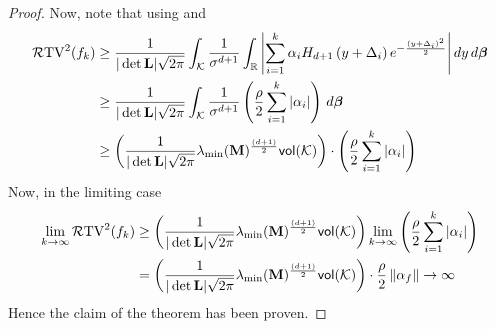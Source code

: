 \begin{proof}
    \noindent Now, note that using  and 
    \begin{align*}
        \mathcal{R}\mathrm{TV}^2({f_k}) &\ge \frac{1}{|\det \mathbf{L}| \sqrt{2\pi}} \int_{{\mathcal{K}}} \frac{1}{\sigma^{d+1}} \int_{\mathbb{R}} \left| \sum_{i=1}^k \alpha_i H_{d+1}\left( y + \Delta_i \right) e^{ -\frac{(y + \Delta_i)^2}{2} } \right| dy \, d\bm{\beta} \\
        & \ge \frac{1}{|\det \mathbf{L}| \sqrt{2\pi}} \int_{{\mathcal{K}}} \frac{1}{\sigma^{d+1}}   \left( {\frac{\rho}{2}\sum_{i=1}^k |\alpha_i| } \right)  \, d\bm{\beta}\\
        & \ge  \left( {\frac{1}{|\det \mathbf{L}| \sqrt{2\pi}} \lambda_{\min}(\mathbf{M})^{\frac{(d+1)} {2}} \textsf{vol}({{\mathcal{K}}})} \right)  \cdot \left( {\frac{\rho}{2}\sum_{i=1}^k |\alpha_i| } \right) 
    \end{align*}
    Now, in the limiting case
    \begin{align*}
        \lim_{k \to \infty} \mathcal{R}\mathrm{TV}^2({f_k}) &\ge  \left( {\frac{1}{|\det \mathbf{L}| \sqrt{2\pi}} \lambda_{\min}(\mathbf{M})^{\frac{(d+1)} {2}} \textsf{vol}({{\mathcal{K}}})} \right)  \lim_{k \to \infty}  \left( {\frac{\rho}{2}\sum_{i=1}^k |\alpha_i| } \right)  \\
        & =   \left( {\frac{1}{|\det \mathbf{L}| \sqrt{2\pi}} \lambda_{\min}(\mathbf{M})^{\frac{(d+1)} {2}} \textsf{vol}({{\mathcal{K}}})} \right)  \cdot \frac{\rho}{2} \left\|\alpha_f\right\| \to \infty
    \end{align*}
    Hence the claim of the theorem has been proven.
\end{proof}
    
    
    
    


